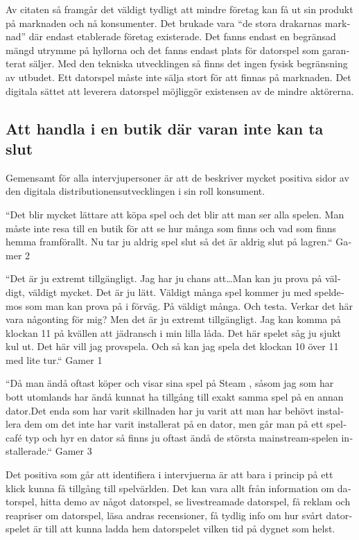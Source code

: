\documentclass[11p]{article}
\begin{document}
\begin{otherlanguage}{swedish}
    \setlength{\leftskip}{0cm}
    Av citaten så framgår det väldigt tydligt att mindre företag kan få ut sin produkt på marknaden och nå konsumenter. Det brukade vara “de stora drakarnas marknad” där endast etablerade företag existerade. Det fanns endast en begränsad mängd utrymme på hyllorna och det fanns endast plats för datorspel som garanterat säljer. Med den tekniska utvecklingen så finns det ingen fysisk begränsning av utbudet. Ett datorspel måste inte sälja stort för att finnas på marknaden. Det digitala sättet att leverera datorspel möjliggör existensen av de mindre aktörerna.


   \subsection{Att handla i en butik där varan inte kan ta slut }

    Gemensamt för alla intervjupersoner är att de beskriver mycket positiva sidor av den digitala distributionensutvecklingen i sin roll konsument.


    \setlength{\leftskip}{1cm}

    “Det blir mycket lättare att köpa spel och det blir att man ser alla spelen. Man måste inte resa till en butik för att se hur många som finns och vad som finns hemma framförallt. Nu tar ju aldrig spel slut så det är aldrig slut på lagren.“ Gamer 2

    “Det är ju extremt tillgängligt. Jag har ju chans att\dots Man kan ju prova på väldigt, väldigt mycket. Det är ju lätt. Väldigt många spel kommer ju med speldemos som man kan prova på i förväg. På väldigt många. Och testa. Verkar det här vara någonting för mig? Men det är ju extremt tillgängligt. Jag kan komma på klockan 11 på kvällen att jädransch i min lilla låda. Det här spelet såg ju sjukt kul ut. Det här vill jag provspela. Och så kan jag spela det klockan 10 över 11 med lite tur.“ Gamer 1

    “Då man ändå oftast köper och visar sina spel på Steam , såsom jag som har bott utomlands har ändå kunnat ha tillgång till exakt samma spel på en annan dator.Det enda som har varit skillnaden har ju varit att man har behövt installera dem om det inte har varit installerat på en dator, men går man på ett spelcafé typ och hyr en dator så finns ju oftast ändå de största mainstream-spelen installerade.“ Gamer 3

    \setlength{\leftskip}{0cm}
    Det positiva som går att identifiera i intervjuerna är att bara i princip på ett klick kunna få tillgång till spelvärlden. Det kan vara allt från information om datorspel, hitta demo av något datorspel, se livestreamade datorspel, få reklam och reapriser om datorspel, läsa andras recensioner, få tydlig info om hur svårt datorspelet är till att kunna ladda hem datorspelet vilken tid på dygnet som helst.


\end{otherlanguage}
\end{document}
